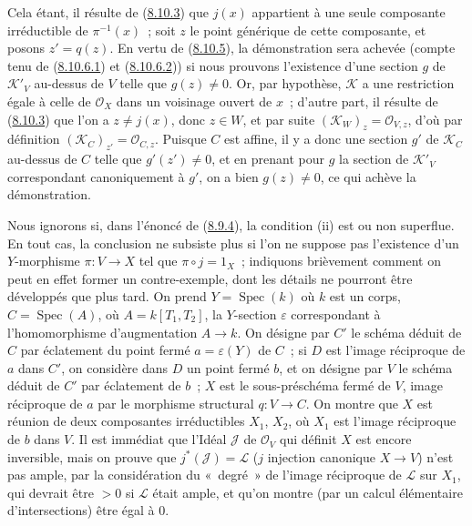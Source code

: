 \begin{env}[8.10.6]
Cela étant, il résulte de (\hyperref[II.8.10.3-fr]{8.10.3}) que $j(x)$
appartient à une seule composante irréductible de $\pi^{-1}(x)$~; soit $z$ le
point générique de cette composante, et posons $z'=q(z)$. En vertu de
(\hyperref[II.8.10.5-fr]{8.10.5}), la démonstration sera achevée (compte tenu
de (\hyperref[II.8.10.6.1-fr]{8.10.6.1}) et
(\hyperref[II.8.10.6.2-fr]{8.10.6.2})) si nous prouvons l'existence d'une
section $g$ de $\mathcal{K}'_V$ au-dessus de $V$ telle que $g(z)\neq0$. Or,
par hypothèse, $\mathcal{K}$ a une restriction égale à celle de
$\mathcal{O}_X$ dans un voisinage ouvert de $x$~; d'autre part, il résulte de
(\hyperref[II.8.10.3-fr]{8.10.3}) que l'on a $z\neq j(x)$, donc $z\in W$, et
par suite $(\mathcal{K}_W)_z=\mathcal{O}_{V,z}$, d'où par définition
$(\mathcal{K}_C)_{z'}=\mathcal{O}_{C,z}$. Puisque $C$ est affine, il y a donc
une section $g'$ de $\mathcal{K}_C$ au-dessus de $C$ telle que
$g'(z')\neq0$, et en prenant pour $g$ la section de $\mathcal{K}'_V$
correspondant canoniquement à $g'$, on a bien $g(z)\neq0$, ce qui achève la
démonstration.
\end{env}

\begin{remark}[8.10.7]
\label{II.8.10.7-fr}
Nous ignorons si, dans l'énoncé de (\hyperref[II.8.9.4-fr]{8.9.4}), la
condition (ii) est ou non superflue. En tout cas, la conclusion ne subsiste
plus si l'on ne suppose pas l'existence d'un $Y$-morphisme $\pi:V\to X$ tel
que $\pi\circ j=1_X$~; indiquons brièvement comment on peut en effet former un
contre-exemple, dont les détails ne pourront être développés que plus tard.
On prend $Y=\operatorname{Spec}(k)$ où $k$ est un corps,
$C=\operatorname{Spec}(A)$, où $A=k[T_1,T_2]$, la $Y$-section $\varepsilon$
correspondant à l'homomorphisme d'augmentation $A\to k$. On désigne par $C'$
le schéma déduit de $C$ par éclatement du point fermé $a=\varepsilon(Y)$ de
$C$~; si $D$ est l'image réciproque de $a$ dans $C'$, on considère dans $D$
un point fermé $b$,
et on désigne par $V$ le schéma déduit de $C'$ par éclatement de $b$~; $X$ est
le sous-préschéma fermé de $V$, image réciproque de $a$ par le morphisme
structural $q:V\to C$. On montre que $X$ est réunion de deux composantes
irréductibles $X_1$, $X_2$, où $X_1$ est l'image réciproque de $b$ dans $V$.
Il est immédiat que l'Idéal $\mathcal{J}$ de $\mathcal{O}_V$ qui définit $X$
est encore inversible, mais on prouve que
$j^*(\mathcal{J})=\mathcal{L}$ ($j$ injection canonique $X\to V$) n'est pas
ample, par la considération du «~degré~» de l'image réciproque de
$\mathcal{L}$ sur $X_1$, qui devrait être $>0$ si $\mathcal{L}$ était ample,
et qu'on montre (par un calcul élémentaire d'intersections) être égal à 0.
\end{remark}

